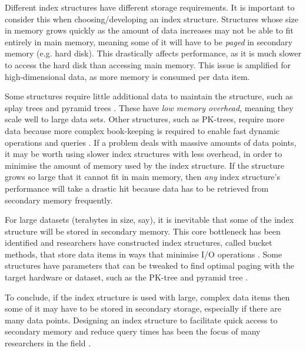 Different index structures have different storage requirements. It is important to consider this when choosing/developing an index structure. Structures whose size in memory grows quickly as the amount of data increases may not be able to fit entirely in main memory, meaning some of it will have to be \textit{paged} in secondary memory (e.g. hard disk). This drastically affects performance, as it is much slower to access the hard disk than accessing main memory. This issue is amplified for high-dimensional data, as more memory is consumed per data item.

Some structures require little additional data to maintain the structure, such as splay trees and pyramid trees \cite{splay-tree, pyramid-tree}. These have \textit{low memory overhead}, meaning they scale well to large data sets. Other structures, such as PK-trees, require more data because more complex book-keeping is required to enable fast dynamic operations and queries \cite{pk-tree}. If a problem deals with massive amounts of data points, it may be worth using slower index structures with less overhead, in order to minimise the amount of memory used by the index structure. If the structure grows so large that it cannot fit in main memory, then \textit{any} index structure's performance will take a drastic hit because data has to be retrieved from secondary memory frequently.

For large datasets (terabytes in size, say), it is inevitable that some of the index structure will be stored in secondary memory. This core bottleneck has been identified and researchers have constructed index structures, called bucket methods, that store data items in ways that minimise I/O operations \cite{md-structures-samet}. Some structures have parameters that can be tweaked to find optimal paging with the target hardware or dataset, such as the PK-tree and pyramid tree \cite{pyramid-tree, pk-tree}.

To conclude, if the index structure is used with large, complex data items then some of it may have to be stored in secondary storage, especially if there are many data points. Designing an index structure to facilitate quick access to secondary memory and reduce query times has been the focus of many researchers in the field  \cite{rsr-tree, rs-tree}.

